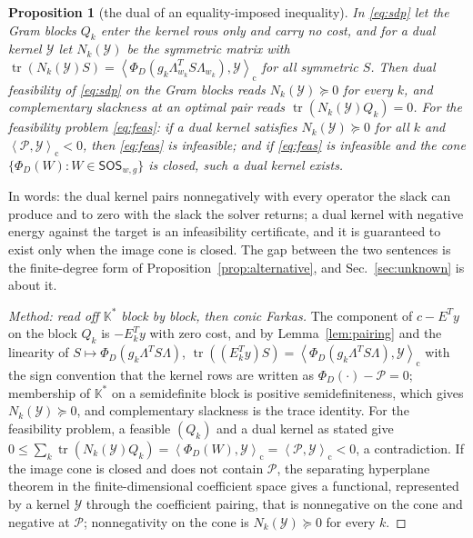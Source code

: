 \documentclass[12pt]{article}
\newcommand{\mcl}[1]{\mathcal{#1}}
\newcommand{\mrm}[1]{\mathrm{#1}}
\newcommand{\ipc}[2]{\left\langle #1,#2\right\rangle_{\mrm{c}}}
\newcommand{\SOS}{\mathsf{SOS}}
\DeclareMathOperator{\tr}{tr}
\theoremstyle{plain}
\newtheorem{proposition}[theorem]{Proposition}
\theoremstyle{definition}
\theoremstyle{remark}
\begin{document}
\begin{proposition}[the dual of an equality-imposed inequality]\label{prop:dualineq}
In \eqref{eq:sdp} let the Gram blocks $Q_k$ enter the kernel rows only and carry no cost, and for a dual kernel $\mcl Y$ let $N_k(\mcl Y)$ be the symmetric matrix with $\tr(N_k(\mcl Y)S)=\ipc{\Phi_D(g_k\Lambda_{w_k}^TS\Lambda_{w_k})}{\mcl Y}$ for all symmetric $S$. Then dual feasibility of \eqref{eq:sdp} on the Gram blocks reads $N_k(\mcl Y)\succeq0$ for every $k$, and complementary slackness at an optimal pair reads $\tr(N_k(\mcl Y)Q_k)=0$. For the feasibility problem \eqref{eq:feas}: if a dual kernel satisfies $N_k(\mcl Y)\succeq0$ for all $k$ and $\ipc{\mcl P}{\mcl Y}<0$, then \eqref{eq:feas} is infeasible; and if \eqref{eq:feas} is infeasible and the cone $\{\Phi_D(W):W\in\SOS_{w,g}\}$ is closed, such a dual kernel exists.
\end{proposition}
In words: the dual kernel pairs nonnegatively with every operator the slack can produce and to zero with the slack the solver returns; a dual kernel with negative energy against the target is an infeasibility certificate, and it is guaranteed to exist only when the image cone is closed. The gap between the two sentences is the finite-degree form of Proposition~\ref{prop:alternative}, and Sec.~\ref{sec:unknown} is about it.
\begin{proof}[Method: read off $\mathbb K^*$ block by block, then conic Farkas]
The component of $c-E^Ty$ on the block $Q_k$ is $-E_k^Ty$ with zero cost, and by Lemma~\ref{lem:pairing} and the linearity of $S\mapsto\Phi_D(g_k\Lambda^TS\Lambda)$, $\tr((E_k^Ty)S)=\ipc{\Phi_D(g_k\Lambda^TS\Lambda)}{\mcl Y}$ with the sign convention that the kernel rows are written as $\Phi_D(\cdot)-\mcl P=0$; membership of $\mathbb K^*$ on a semidefinite block is positive semidefiniteness, which gives $N_k(\mcl Y)\succeq0$, and complementary slackness is the trace identity. For the feasibility problem, a feasible $(Q_k)$ and a dual kernel as stated give $0\le\sum_k\tr(N_k(\mcl Y)Q_k)=\ipc{\Phi_D(W)}{\mcl Y}=\ipc{\mcl P}{\mcl Y}<0$, a contradiction. If the image cone is closed and does not contain $\mcl P$, the separating hyperplane theorem in the finite-dimensional coefficient space gives a functional, represented by a kernel $\mcl Y$ through the coefficient pairing, that is nonnegative on the cone and negative at $\mcl P$; nonnegativity on the cone is $N_k(\mcl Y)\succeq0$ for every $k$.
\end{proof}
\end{document}
